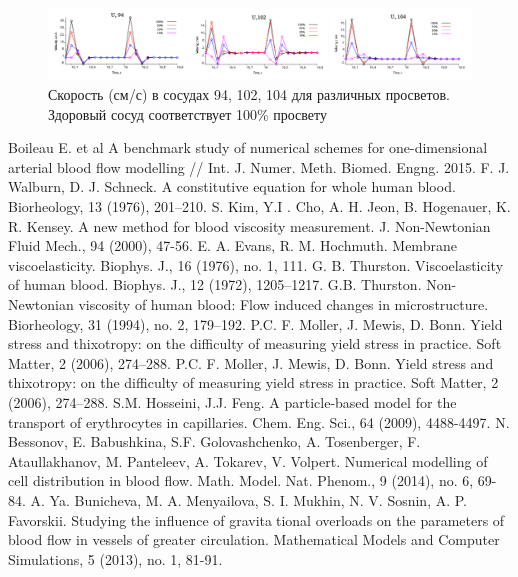 \documentclass[a4paper, 14pt]{article}
\begin{document}
\begin{figure}[h]
\centering
\includegraphics[width=0.9\linewidth]{grap.png}
\caption{Скорость (см/с) в сосудах 94, 102, 104 для различных просветов. Здоровый сосуд
соответствует 100\% просвету}
\label{fig:mpr}
\end{figure}


\newpage
{}
\begin{thebibliography}{}
      Boileau E. et al A benchmark study of numerical schemes for one-dimensional arterial blood flow modelling // Int. J. Numer. Meth. Biomed. Engng. 2015.
     F. J. Walburn, D. J. Schneck. A constitutive equation for whole human blood. Biorheology, 13 (1976), 201–210.
     S. Kim, Y.I . Cho, A. H. Jeon, B. Hogenauer, K. R. Kensey. A new method for blood viscosity measurement. J. Non-Newtonian Fluid Mech., 94 (2000), 47-56.
      E. A. Evans, R. M. Hochmuth. Membrane viscoelasticity. Biophys. J., 16 (1976), no. 1, 111.
     G. B. Thurston. Viscoelasticity of human blood. Biophys. J., 12 (1972), 1205–1217.
     G.B. Thurston. Non-Newtonian viscosity of human blood: Flow induced changes in microstructure. Biorheology, 31 (1994), no. 2, 179–192.
     P.C. F. Moller, J. Mewis, D. Bonn. Yield stress and thixotropy: on the difficulty of measuring yield stress in practice. Soft Matter, 2 (2006), 274–288.
      P.C. F. Moller, J. Mewis, D. Bonn. Yield stress and thixotropy: on the difficulty of measuring yield stress in practice. Soft Matter, 2 (2006), 274–288.
      S.M. Hosseini, J.J. Feng. A particle-based model for the transport of erythrocytes in capillaries. Chem. Eng. Sci., 64 (2009), 4488-4497.
     N. Bessonov, E. Babushkina, S.F. Golovashchenko, A. Tosenberger, F. Ataullakhanov, M. Panteleev, A. Tokarev, V. Volpert. Numerical modelling of cell distribution in blood flow. Math. Model. Nat. Phenom., 9 (2014), no. 6, 69-84.
     A. Ya. Bunicheva, M. A. Menyailova, S. I. Mukhin, N. V. Sosnin, A. P. Favorskii. Studying the influence of gravitational overloads on the parameters of blood flow in vessels of greater circulation. Mathematical Models and Computer Simulations, 5 (2013), no. 1, 81-91.

\end{thebibliography}
\end{document}
